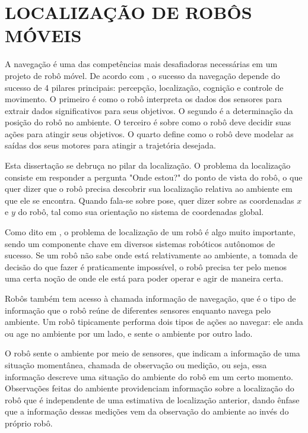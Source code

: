 \documentclass[acronym, symbols, table, deposito]{fei}
\begin{document}
	\chapter{LOCALIZAÇÃO DE ROBÔS MÓVEIS}\label{sec:chapter_localizacao_robos_moveis}
		
		A navegação é uma das competências mais desafiadoras necessárias em um projeto de robô móvel. De acordo com \textcite{siegwart2011introduction}, o sucesso da navegação depende do sucesso de 4 pilares principais: percepção, localização, cognição e controle de movimento. O primeiro é como o robô interpreta os dados dos sensores para extrair dados significativos para seus objetivos. O segundo é a determinação da posição do robô no ambiente. O terceiro é sobre como o robô deve decidir suas ações para atingir seus objetivos. O quarto define como o robô deve modelar as saídas dos seus motores para atingir a trajetória desejada.
			
		Esta dissertação se debruça no pilar da localização. O problema da localização consiste em responder a pergunta "Onde estou?" do ponto de vista do robô, o que quer dizer que o robô precisa descobrir sua localização relativa ao ambiente em que ele se encontra. Quando fala-se sobre pose, quer dizer sobre as coordenadas $x$ e $y$ do robô, tal como sua orientação no sistema de coordenadas global.
			
		Como dito em \textcite{thrun2001robust}, o problema de localização de um robô é algo muito importante, sendo um componente chave em diversos sistemas robóticos autônomos de sucesso. Se um robô não sabe onde está relativamente ao ambiente, a tomada de decisão do que fazer é praticamente impossível, o robô precisa ter pelo menos uma certa noção de onde ele está para poder operar e agir de maneira certa.
		
		Robôs também tem acesso à chamada informação de navegação, que é o tipo de informação que o robô reúne de diferentes sensores enquanto navega pelo ambiente. Um robô tipicamente performa dois tipos de ações ao navegar: ele anda ou age no ambiente por um lado, e sente o ambiente por outro lado.
		
		O robô sente o ambiente por meio de sensores, que indicam a informação de uma situação momentânea, chamada de observação ou medição, ou seja, essa informação descreve uma situação do ambiente do robô em um certo momento. Observações feitas do ambiente providenciam informação sobre a localização do robô que é independente de uma estimativa de localização anterior, dando ênfase que a informação dessas medições vem da observação do ambiente ao invés do próprio robô.
			
\end{document}
